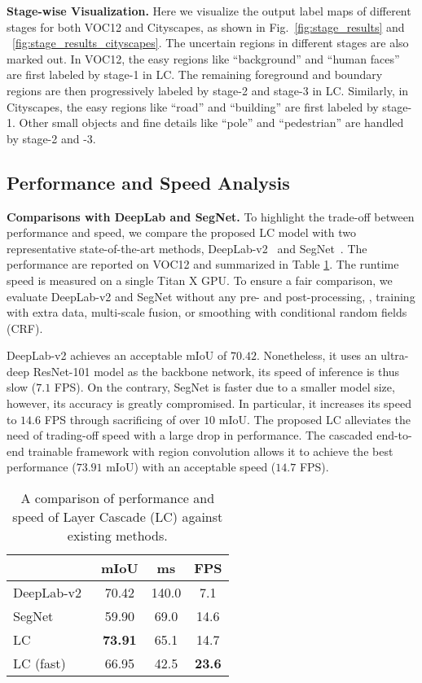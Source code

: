 \documentclass[10pt,twocolumn,letterpaper]{article}
\begin{document}
\noindent
\textbf{Stage-wise Visualization.}
Here we visualize the output label maps of different stages for both VOC12 and Cityscapes, as shown in Fig.~\ref{fig:stage_results} and ~\ref{fig:stage_results_cityscapes}.
The uncertain regions in different stages are also marked out.
In VOC12, the easy regions like ``background'' and ``human faces'' are first labeled by stage-1 in LC.
The remaining foreground and boundary regions are then progressively labeled by stage-2 and stage-3 in LC. 
Similarly, in Cityscapes, the easy regions like ``road'' and ``building'' are first labeled by stage-1.
Other small objects and fine details like ``pole'' and ``pedestrian'' are handled by stage-2 and -3.

\subsection{Performance and Speed Analysis}



\noindent
\textbf{Comparisons with DeepLab and SegNet.}
To highlight the trade-off between performance and speed, we compare the proposed LC model with two representative state-of-the-art methods, DeepLab-v2~\cite{CP2016Deeplab} and SegNet~\cite{badrinarayanan2015segnet}.
The performance are reported on VOC12 and summarized in Table \ref{tab:region_conv}. The runtime speed is measured on a single Titan X GPU.
To ensure a fair comparison, we evaluate DeepLab-v2 and SegNet without any pre- and post-processing, \eg, training with extra data, multi-scale fusion, or smoothing with conditional random fields (CRF).

DeepLab-v2 achieves an acceptable mIoU of $70.42$.
Nonetheless, it uses an ultra-deep ResNet-101 model as the backbone network, its speed of inference is thus slow ($7.1$ FPS).
On the contrary, SegNet is faster due to a smaller model size, however, its accuracy is greatly compromised. In particular, it increases its speed to $14.6$ FPS through sacrificing of over $10$ mIoU.
The proposed LC alleviates the need of trading-off speed with a large drop in performance. The cascaded end-to-end trainable framework with region convolution allows it to achieve the best performance ($73.91$ mIoU) with an acceptable speed ($14.7$ FPS).

\begin{table}[t]
    \small
\caption{A comparison of performance and speed of Layer Cascade (LC) against existing methods.}
    \centering
    \begin{tabular}{l|c|c|c}
        \hline
        &mIoU&ms&FPS\\
        \hline\hline
        DeepLab-v2~\cite{CP2016Deeplab}&70.42&140.0&7.1\\
        SegNet~\cite{badrinarayanan2015segnet}&59.90&69.0&14.6\\
        \hline\hline    
        LC &\textbf{73.91}&65.1&14.7\\
        LC (fast)&66.95&42.5&\textbf{23.6}\\
        \hline
    \end{tabular}
    \label{tab:region_conv}
\end{table}
\end{document}
